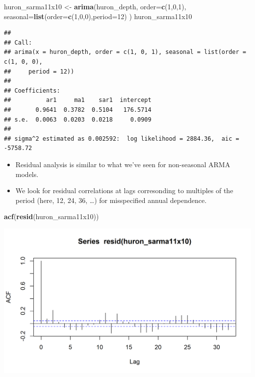 \documentclass[]{article}
\newenvironment{Shaded}{\begin{snugshade}}{\end{snugshade}}
\newcommand{\KeywordTok}[1]{\textcolor[rgb]{0.13,0.29,0.53}{\textbf{#1}}}
\newcommand{\DataTypeTok}[1]{\textcolor[rgb]{0.13,0.29,0.53}{#1}}
\newcommand{\DecValTok}[1]{\textcolor[rgb]{0.00,0.00,0.81}{#1}}
\newcommand{\StringTok}[1]{\textcolor[rgb]{0.31,0.60,0.02}{#1}}
\newcommand{\NormalTok}[1]{#1}
\begin{document}
\begin{Shaded}
\begin{Highlighting}[]
\NormalTok{huron_sarma11x10 <-}\StringTok{ }\KeywordTok{arima}\NormalTok{(huron_depth,}
   \DataTypeTok{order=}\KeywordTok{c}\NormalTok{(}\DecValTok{1}\NormalTok{,}\DecValTok{0}\NormalTok{,}\DecValTok{1}\NormalTok{),}
   \DataTypeTok{seasonal=}\KeywordTok{list}\NormalTok{(}\DataTypeTok{order=}\KeywordTok{c}\NormalTok{(}\DecValTok{1}\NormalTok{,}\DecValTok{0}\NormalTok{,}\DecValTok{0}\NormalTok{),}\DataTypeTok{period=}\DecValTok{12}\NormalTok{)}
\NormalTok{)}
\NormalTok{huron_sarma11x10}
\end{Highlighting}
\end{Shaded}


\begin{verbatim}
## 
## Call:
## arima(x = huron_depth, order = c(1, 0, 1), seasonal = list(order = c(1, 0, 0), 
##     period = 12))
## 
## Coefficients:
##          ar1     ma1    sar1  intercept
##       0.9641  0.3782  0.5104   176.5714
## s.e.  0.0063  0.0203  0.0218     0.0909
## 
## sigma^2 estimated as 0.002592:  log likelihood = 2884.36,  aic = -5758.72
\end{verbatim}

\begin{itemize}
\item
  Residual analysis is similar to what we've seen for non-seasonal ARMA
  models.
\item
  We look for residual correlations at lags corresonding to multiples of
  the period (here, 12, 24, 36, \ldots{}) for misspecified annual
  dependence.
\end{itemize}

\begin{Shaded}
\begin{Highlighting}[]
\KeywordTok{acf}\NormalTok{(}\KeywordTok{resid}\NormalTok{(huron_sarma11x10))}
\end{Highlighting}
\end{Shaded}

\begin{center}\includegraphics{figure/intro-residuals-1} \end{center}
\end{document}
